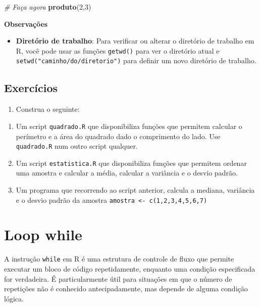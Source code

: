 \documentclass[
]{book}
\newenvironment{Shaded}{\begin{snugshade}}{\end{snugshade}}
\newcommand{\CommentTok}[1]{\textcolor[rgb]{0.56,0.35,0.01}{\textit{#1}}}
\newcommand{\DecValTok}[1]{\textcolor[rgb]{0.00,0.00,0.81}{#1}}
\newcommand{\FunctionTok}[1]{\textcolor[rgb]{0.13,0.29,0.53}{\textbf{#1}}}
\newcommand{\NormalTok}[1]{#1}
\providecommand{\tightlist}{%
  \setlength{\itemsep}{0pt}\setlength{\parskip}{0pt}}
\begin{document}
\begin{Shaded}
\begin{Highlighting}[]
\CommentTok{\# Faça agora}
\FunctionTok{produto}\NormalTok{(}\DecValTok{2}\NormalTok{,}\DecValTok{3}\NormalTok{)}
\end{Highlighting}
\end{Shaded}

\textbf{Observações}

\begin{itemize}
\tightlist
\item
  \textbf{Diretório de trabalho}: Para verificar ou alterar o diretório de trabalho em R, você pode usar as funções \texttt{getwd()} para ver o diretório atual e \texttt{setwd("caminho/do/diretorio")} para definir um novo diretório de trabalho.
\end{itemize}

\section{Exercícios}\label{exercuxedcios-6}

\begin{enumerate}
\def\labelenumi{\arabic{enumi}.}
\tightlist
\item
  Construa o seguinte:
\end{enumerate}

\begin{enumerate}
\def\labelenumi{(\alph{enumi})}
\item
  Um script \texttt{quadrado.R} que disponibiliza funções que permitem calcular o perímetro e a área do quadrado dado o comprimento do lado. Use \texttt{quadrado.R} num outro script qualquer.
\item
  Um script \texttt{estatistica.R} que disponibiliza funções que permitem ordenar uma amostra e calcular a média, calcular a variância e o desvio padrão.
\item
  Um programa que recorrendo ao script anterior, calcula a mediana, variância e o desvio padrão da amostra \texttt{amostra\ \textless{}-\ c(1,2,3,4,5,6,7)}
\end{enumerate}

\chapter{Loop while}\label{loop-while}

A instrução \texttt{while} em R é uma estrutura de controle de fluxo que permite executar um bloco de código repetidamente, enquanto uma condição especificada for verdadeira. É particularmente útil para situações em que o número de repetições não é conhecido antecipadamente, mas depende de alguma condição lógica.
\end{document}
